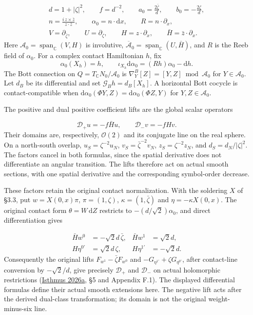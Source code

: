 \documentclass[
  english,
  11pt,
  reqno]{amsart}
\begin{document}
\label{eq:online-contact-response-flat-frame} \[
\begin{gathered}
d=1+|\zeta|^2,\qquad f=d^{-2},\qquad
a_0=\frac{2\bar\zeta}{d},\qquad b_0=-\frac{2\zeta}{d},\\
n=\frac{i\,z\times\bar z}{z\cdot\bar z},\qquad
\alpha_0=n\cdot\mathrm dx,\qquad R=n\cdot\partial_x,\\
V=\partial_{\bar\zeta},\qquad U=\partial_\zeta,\qquad
H=z\cdot\partial_x,\qquad \bar H=\bar z\cdot\partial_x.
\end{gathered}
\] Here \(\mathcal A_0=\operatorname{span}_{\mathbb C}(V,H)\) is
involutive,
\(\overline{\mathcal A}_0=\operatorname{span}_{\mathbb C}(U,\bar H)\),
and \(R\) is the Reeb field of \(\alpha_0\). For a complex contact
Hamiltonian \(h\), fix \[
\alpha_0(X_h)=h,\qquad
\iota_{X_h}\mathrm d\alpha_0=(Rh)\alpha_0-\mathrm dh.
\] The Bott connection on \(Q=T_{\mathbb C}N_0/\mathcal A_0\) is
\(\nabla^B_Y[Z]=[Y,Z]\bmod \mathcal A_0\) for \(Y\in \mathcal A_0\). Let
\(d_B\) be its differential and set \(\mathcal G_Bh=d_B[X_h]\). A
horizontal Bott cocycle is contact-compatible when
\(\mathrm d\alpha_0(\Phi Y,Z)=\mathrm d\alpha_0(\Phi Z,Y)\) for
\(Y,Z\in \mathcal A_0\).

The positive and dual positive coefficient lifts are the global scalar
operators

\label{eq:online-actual-chiral-contact-lifts} \[
\mathcal D_+u=-f\bar H u,\qquad
\mathcal D_-v=-fHv.
\] Their domains are, respectively, \(\mathcal O(2)\) and its conjugate
line on the real sphere. On a north-south overlap,
\(u_S=\zeta^{-2}u_N\), \(v_S=\bar\zeta^{-2}v_N\), \(z_S=\zeta^{-2}z_N\),
and \(d_S=d_N/|\zeta|^2\). The factors cancel in both formulas, since
the spatial derivative does not differentiate an angular transition. The
lifts therefore act on actual smooth sections, with one spatial
derivative and the corresponding symbol-order decrease.

These factors retain the original contact normalization. With the
soldering \(X\) of §3.3, put \(w=X(0,x)\pi\), \(\pi=(1,\zeta)\),
\(\kappa=(1,\bar\zeta)\) and \(\eta=-\kappa X(0,x)\). The original
contact form \(\theta=W\,\mathrm dZ\) restricts to
\(-(d/\sqrt2)\alpha_0\), and direct differentiation gives

\label{eq:online-contact-response-incidence-derivatives}
\[
\begin{aligned}
\bar H w^0&=-\sqrt2d\,\bar\zeta,&
\bar H w^1&=\sqrt2d,\\
H\eta^{0'}&=\sqrt2d\,\zeta,&
H\eta^{1'}&=-\sqrt2d.
\end{aligned}
\] Consequently the original lifts \(F_{w^1}-\bar\zeta F_{w^0}\) and
\(-G_{\eta^{1'}}+\zeta G_{\eta^{0'}}\), after contact-line conversion by
\(-\sqrt2/d\), give precisely \(\mathcal D_+\) and \(\mathcal D_-\) on
actual holomorphic restrictions (\hyperref[ref-IsthmusLocal2026]{Isthmus
2026a}, §5 and Appendix F.1). The displayed differential formulas define
their actual smooth extensions here. The negative lift acts after the
derived dual-class transformation; its domain is not the original
weight-minus-six line.
\end{document}
